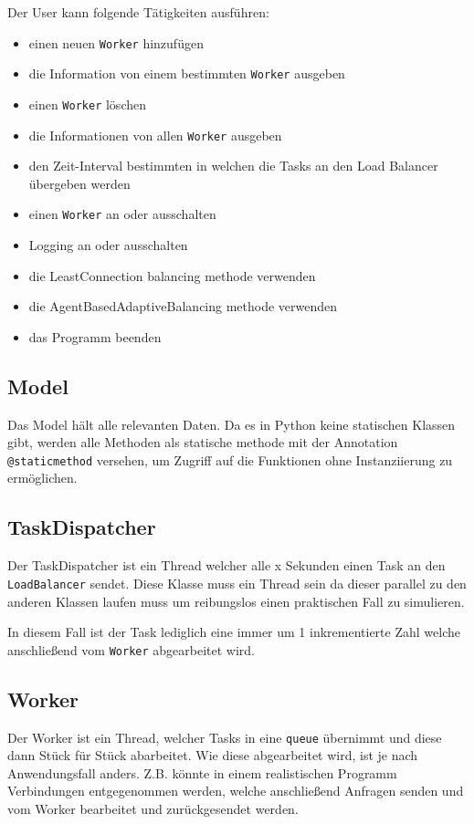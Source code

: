  Der User kann folgende Tätigkeiten ausführen:
 
 \begin{itemize}
 	\item einen neuen \verb|Worker| hinzufügen
 	\item die Information von einem bestimmten \verb|Worker| ausgeben
 	\item einen \verb|Worker| löschen
 	\item die Informationen von allen \verb|Worker| ausgeben
	\item den Zeit-Interval bestimmten in welchen die Tasks an den Load Balancer übergeben werden
	\item einen \verb|Worker| an oder ausschalten
	\item Logging an oder ausschalten
	\item die LeastConnection balancing methode verwenden
	\item die AgentBasedAdaptiveBalancing methode verwenden
	\item das Programm beenden
 \end{itemize}

\subsection{Model}
Das Model hält alle relevanten Daten. Da es in Python keine statischen Klassen gibt, werden alle Methoden als statische methode mit der Annotation \verb|@staticmethod| versehen, um Zugriff auf die Funktionen ohne Instanziierung zu ermöglichen.

\subsection{TaskDispatcher}
Der TaskDispatcher ist ein Thread welcher alle x Sekunden einen Task an den \verb|LoadBalancer| sendet. Diese Klasse muss ein Thread sein da dieser parallel zu den anderen Klassen laufen muss um reibungslos einen praktischen Fall zu simulieren. 

In diesem Fall ist der Task lediglich eine immer um 1 inkrementierte Zahl welche anschließend vom \verb|Worker| abgearbeitet wird. 

\subsection{Worker}
Der Worker ist ein Thread, welcher Tasks in eine \verb|queue| übernimmt und diese dann Stück für Stück abarbeitet. Wie diese abgearbeitet wird, ist je nach Anwendungsfall anders. Z.B. könnte in einem realistischen Programm Verbindungen entgegenommen werden, welche anschließend Anfragen senden und vom Worker bearbeitet und zurückgesendet werden. 

